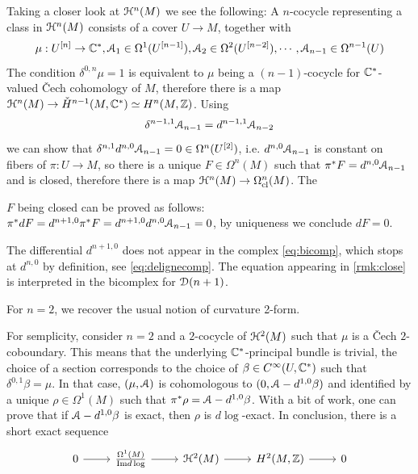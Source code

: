\documentclass[10pt]{amsart}
\begin{document}
Taking a closer look at $\mathcal{H}^n(M)$ we see the following: A $n$-cocycle representing a class in $\mathcal{H}^n(M)$ consists of a cover $U\to M$, together with \[\mu:U^{[n]}\to\mathbb{C}^*,\mathcal{A}_1\in\Omega^1(U^{[n-1]}),\mathcal{A}_2\in\Omega^2(U^{[n-2]}),\cdots,\mathcal{A}_{n-1}\in\Omega^{n-1}(U)\]
The condition $\delta^{0,n}\mu=1$ is equivalent to $\mu$ being a $(n-1)$-cocycle for $\mathbb{C}^*$-valued \v Cech cohomology of $M$, therefore there is a map $\mathcal{H}^n(M)\to\check{H}^{n-1}(M,\mathbb{C}^*)\simeq H^n(M,\mathbb{Z})$. Using \[\delta^{n-1,1}\mathcal{A}_{n-1}= d^{n-1,1}\mathcal{A}_{n-2}\]we can show that $\delta^{n,1} d^{n,0}\mathcal{A}_{n-1}=0\in\Omega^n(U^{[2]})$, i.e. $ d^{n,0}\mathcal{A}_{n-1}$ is constant on fibers of $\pi:U\to M$, so there is a unique $F\in\Omega^{n}(M)$ such that $\pi^*F= d^{n,0}\mathcal{A}_{n-1}$ and is closed, therefore there is a map $\mathcal{H}^n(M)\to\Omega^{n}_{\mathrm{cl}}(M)$. The 
\begin{remark}\label{rmk:close}
	$F$ being closed can be proved as follows: $\pi^* d F= d^{n+1,0}\pi^*F= d^{n+1,0} d^{n,0}\mathcal{A}_{n-1}=0$, by uniqueness we conclude $dF=0$. 
\end{remark}
\begin{remark}[\textcolor{red}{Achtung}] The differential $d^{n+1,0}$ does not appear in the complex \cref{eq:bicomp}, which stops at $d^{n,0}$ by definition, see \cref{eq:delignecomp}. The equation appearing in \cref{rmk:close} is interpreted in the bicomplex for $\mathcal{D}(n+1)$. 
\end{remark}
\begin{remark}
	For $n=2$, we recover the usual notion of curvature 2-form. 
\end{remark}
For semplicity, consider $n=2$ and a $2$-cocycle of $\mathcal{H}^2(M)$ such that $\mu$ is a \v Cech $2$-coboundary. This means that the underlying $\mathbb{C}^*$-principal bundle is trivial, the choice of a section corresponds to the choice of $\beta\in C^\infty(U,\mathbb{C}^*)$ such that $\delta^{0,1}\beta=\mu$. In that case, $(\mu,\mathcal{A})$ is cohomologous to $(0,\mathcal{A}-d^{1,0}\beta)$ and identified by a unique $\rho\in\Omega^1(M)$ such that $\pi^*\rho=\mathcal{A}-d^{1,0}\beta$. With a bit of work, one can prove that if $\mathcal{A}-d^{1,0}\beta$ is exact, then $\rho$ is $d\log$-exact. In conclusion, there is a short exact sequence \begin{equation}
	\begin{tikzcd}
		0 \arrow[r] & \frac{\Omega^1(M)}{\mathrm{Im}d\log} \arrow[r] & \lH^2(M) \arrow[r] & H^2(M,\bZ) \arrow[r] & 0
	\end{tikzcd}
\end{equation}
\end{document}
